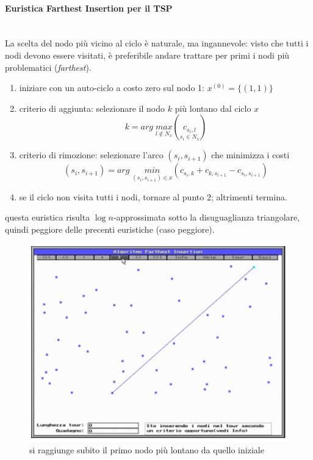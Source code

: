\documentclass{article}
\begin{document}
    \paragraph{Euristica Farthest Insertion per il TSP}\mbox{}\\
    La scelta del nodo più vicino al ciclo è naturale, ma ingannevole: visto che tutti i nodi devono essere visitati,
    è preferibile andare trattare per primi i nodi più problematici (\textit{farthest}).

    \begin{enumerate}
        \item iniziare con un auto-ciclo a costo zero sul nodo 1: $x^{(0)}=\{(1,1)\}$
        \item criterio di aggiunta: selezionare il nodo $k$ più lontano dal ciclo $x$
              $$k=arg\;\underset{l\notin N_x}{max}\left(\underset{s_i\in N_x}{c_{s_i, l}}\right)$$
        \item criterio di rimozione: selezionare l'arco $(s_i,s_{i+1})$ che minimizza i costi
              $$(s_i,s_{i+1})=arg\;\underset{(s_i,s_{i+1})\in x}{min}(c_{s_i,k}+c_{k,s_{i+1}}-c_{s_i,s_{i+1}})$$
        \item se il ciclo non visita tutti i nodi, tornare al punto 2; altrimenti termina.
    \end{enumerate}
    questa euristica risulta $\log n$-approssimata sotto la disuguaglianza triangolare, quindi peggiore delle precenti
    euristiche (caso peggiore).
    \begin{figure}[H]
        \centering
        \includegraphics[scale=0.5]{images/farthest0.png}
        \caption{si raggiunge subito il primo nodo più lontano da quello iniziale}
    \end{figure}
\end{document}
